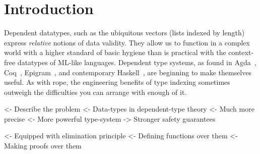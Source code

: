 \documentclass[authoryear]{sigplanconf}
\newenvironment{wstructure}{\comment}{\endcomment}
\begin{document}

\section{Introduction}

Dependent datatypes, such as the ubiquitous vectors (lists indexed by
length) express \emph{relative} notions of data validity. They allow
us to function in a complex world with a higher standard of basic
hygiene than is practical with the context-free datatypes of ML-like
languages. Dependent type systems, as found in
Agda~\cite{norell:agda}, Coq~\cite{coq},
Epigram~\cite{mcbride.mckinna:view-from-the-left}, and contemporary
Haskell~\cite{cheney:gadt, xi:gadt}, are beginning to make themselves useful. As
with rope, the engineering benefits of type indexing sometimes
outweigh the difficulties you can arrange with enough of it.


\begin{wstructure}
<- Describe the problem
    <- Data-types in dependent-type theory
        <- Much more precise
            <- More powerful type-system
            -> Stronger safety guarantees
\end{wstructure}


\begin{wstructure}
        <- Equipped with elimination principle
            <- Defining functions over them
            <- Making proofs over them
\end{wstructure}
\end{document}
